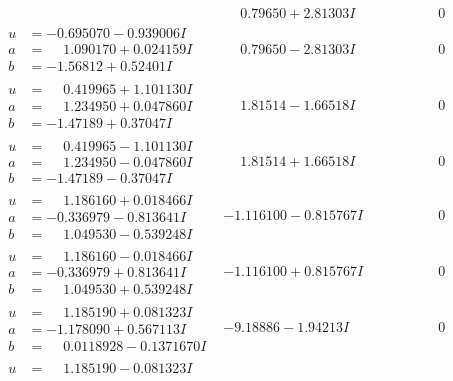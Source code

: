 \documentclass[1p]{elsarticle_modified}
\theoremstyle{definition}
\begin{document}
$$\begin{array}{c|c|c}
 & \phantom{-}0.79650 + 2.81303 I & \phantom{-0.000000 } 0 \\ \hline\begin{aligned}
u &= -0.695070 - 0.939006 I \\
a &= \phantom{-}1.090170 + 0.024159 I \\
b &= -1.56812 + 0.52401 I\end{aligned}
 & \phantom{-}0.79650 - 2.81303 I & \phantom{-0.000000 } 0 \\ \hline\begin{aligned}
u &= \phantom{-}0.419965 + 1.101130 I \\
a &= \phantom{-}1.234950 + 0.047860 I \\
b &= -1.47189 + 0.37047 I\end{aligned}
 & \phantom{-}1.81514 - 1.66518 I & \phantom{-0.000000 } 0 \\ \hline\begin{aligned}
u &= \phantom{-}0.419965 - 1.101130 I \\
a &= \phantom{-}1.234950 - 0.047860 I \\
b &= -1.47189 - 0.37047 I\end{aligned}
 & \phantom{-}1.81514 + 1.66518 I & \phantom{-0.000000 } 0 \\ \hline\begin{aligned}
u &= \phantom{-}1.186160 + 0.018466 I \\
a &= -0.336979 - 0.813641 I \\
b &= \phantom{-}1.049530 - 0.539248 I\end{aligned}
 & -1.116100 - 0.815767 I & \phantom{-0.000000 } 0 \\ \hline\begin{aligned}
u &= \phantom{-}1.186160 - 0.018466 I \\
a &= -0.336979 + 0.813641 I \\
b &= \phantom{-}1.049530 + 0.539248 I\end{aligned}
 & -1.116100 + 0.815767 I & \phantom{-0.000000 } 0 \\ \hline\begin{aligned}
u &= \phantom{-}1.185190 + 0.081323 I \\
a &= -1.178090 + 0.567113 I \\
b &= \phantom{-}0.0118928 - 0.1371670 I\end{aligned}
 & -9.18886 - 1.94213 I & \phantom{-0.000000 } 0 \\ \hline\begin{aligned}
u &= \phantom{-}1.185190 - 0.081323 I \\

\end{aligned}
\end{array}$$
\end{document}
